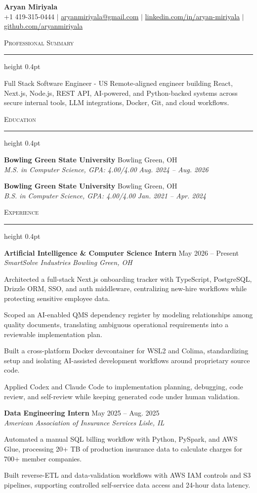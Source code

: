 \documentclass[letterpaper,11pt]{article}
\newcommand{\resumesection}[1]{%
  \par\vspace{2pt}%
  {\large\scshape #1}\par\vspace{2pt}%
  \hrule height 0.4pt\vspace{2pt}%
}
\newcommand{\resumeSubheading}[4]{
  \textbf{#1} \hfill #2\\
  \textit{#3} \hfill \textit{#4}
}
\begin{document}
\begin{center}
  {\LARGE \textbf{Aryan Miriyala}}\\[-1pt]
  \small
  +1 419-315-0444 $|$
  \href{mailto:aryanmiriyala@gmail.com}{aryanmiriyala@gmail.com} $|$
  \href{https://www.linkedin.com/in/aryan-miriyala-7788a21b6/}{linkedin.com/in/aryan-miriyala} $|$
  \href{https://github.com/aryanmiriyala}{github.com/aryanmiriyala}
\end{center}\vspace{-10pt}

\resumesection{Professional Summary}
Full Stack Software Engineer - US Remote-aligned engineer building React, Next.js, Node.js, REST API, AI-powered, and Python-backed systems across secure internal tools, LLM integrations, Docker, Git, and cloud workflows.

\resumesection{Education}
\resumeSubheading
{Bowling Green State University}{Bowling Green, OH}
{M.S. in Computer Science, GPA: 4.00/4.00}{Aug. 2024 -- Aug. 2026}

\resumeSubheading
{Bowling Green State University}{Bowling Green, OH}
{B.S. in Computer Science, GPA: 4.00/4.00}{Jan. 2021 -- Apr. 2024}

\resumesection{Experience}
\resumeSubheading
{Artificial Intelligence \& Computer Science Intern}{May 2026 -- Present}
{SmartSolve Industries}{Bowling Green, OH}
\begin{tightitemize}
  \item Architected a full-stack Next.js onboarding tracker with TypeScript, PostgreSQL, Drizzle ORM, SSO, and auth middleware, centralizing new-hire workflows while protecting sensitive employee data.
  \item Scoped an AI-enabled QMS dependency register by modeling relationships among quality documents, translating ambiguous operational requirements into a reviewable implementation plan.
  \item Built a cross-platform Docker devcontainer for WSL2 and Colima, standardizing setup and isolating AI-assisted development workflows around proprietary source code.
  \item Applied Codex and Claude Code to implementation planning, debugging, code review, and self-review while keeping generated code under human validation.
\end{tightitemize}

\resumeSubheading
{Data Engineering Intern}{May 2025 -- Aug. 2025}
{American Association of Insurance Services}{Lisle, IL}
\begin{tightitemize}
  \item Automated a manual SQL billing workflow with Python, PySpark, and AWS Glue, processing 20+ TB of production insurance data to calculate charges for 700+ member companies.
  \item Built reverse-ETL and data-validation workflows with AWS IAM controls and S3 pipelines, supporting controlled self-service data access and 24-hour data latency.
\end{tightitemize}
\end{document}
